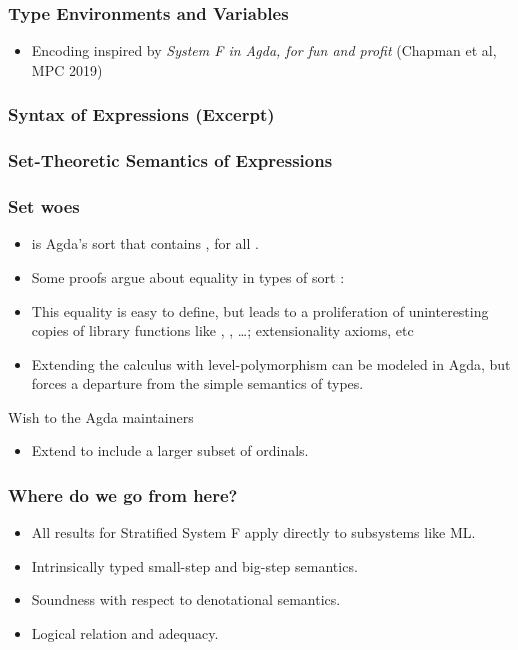 \documentclass[dvipsnames,aspectratio=169,pdftex]{beamer}
\begin{document}
\begin{frame}
  \frametitle{Type Environments and Variables}
  \TFTVEnv
  \pause\vspace{-2\baselineskip}
  \TFCleanerinn
  \begin{itemize}
  \item Encoding inspired by \emph{System F in Agda, for fun and profit} (Chapman et al, MPC 2019)
  \end{itemize}
\end{frame}
\begin{frame}
  \frametitle{Syntax of Expressions (Excerpt)}
  \TFCleanExpr
\end{frame}
\begin{frame}
  \frametitle{Set-Theoretic Semantics of Expressions}
  \TFExprSem
\end{frame}
\begin{frame}
  \frametitle{Set woes}
  \begin{itemize}
  \item {} is Agda's sort that contains , for all .
  \item Some proofs argue about equality in types of sort :
    \TFSingleSubstPreserves
  \item This equality is easy to define, but leads to a proliferation of uninteresting copies of library functions like , , \dots; extensionality axioms, etc
  \item Extending the calculus with level-polymorphism can be modeled in Agda, but forces a departure from the simple semantics of types.
  \end{itemize}
  \begin{exampleblock}{Wish to the  Agda maintainers}
    \begin{itemize}
    \item Extend  to include a larger subset of ordinals.
    \end{itemize}
  \end{exampleblock}
\end{frame}
\begin{frame}
  \frametitle{Where do we go from here?}
  \begin{itemize}
  \item All results for Stratified System F apply directly to subsystems like ML.
  \item Intrinsically typed small-step and big-step semantics.
  \item Soundness with respect to denotational semantics.
  \item Logical relation and adequacy.
  \end{itemize}
\end{frame}
\end{document}
